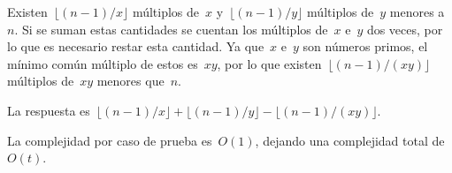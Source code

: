 
Existen~$\lfloor (n - 1) / x \rfloor$ múltiplos de~$x$
y~$\lfloor (n - 1) / y \rfloor$ múltiplos de~$y$ menores a~$n$. Si se suman estas
cantidades se cuentan los múltiplos de~$x$ e~$y$ dos veces, por lo que es necesario
restar esta cantidad. Ya que~$x$ e~$y$ son números primos, el mínimo común múltiplo
de estos es~$xy$, por lo que existen~$\lfloor (n - 1) / (xy) \rfloor$ múltiplos
de~$xy$ menores que~$n$.

La respuesta
es~$\lfloor (n - 1) / x \rfloor + \lfloor (n - 1) / y \rfloor - \lfloor (n - 1) /
(xy) \rfloor$.

La complejidad por caso de prueba es~$O(1)$, dejando una complejidad total de~$O(t)$.

